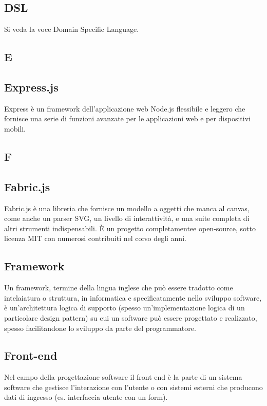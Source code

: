 \subsection*{DSL}
Si veda la voce Domain Specific Language.

\newpage

\begin{center}
\Huge\section*{\uppercase{E}}
\end{center}

\subsection*{Express.js}
Express è un framework dell'applicazione web Node.js flessibile e leggero che fornisce una serie di funzioni avanzate per le applicazioni web e per dispositivi mobili.

\newpage

\begin{center}
\Huge\section*{\uppercase{F}}
\end{center}

\subsection*{Fabric.js}
Fabric.js è una libreria che fornisce un modello a oggetti che manca al canvas, come anche un parser SVG, un livello di interattività, e una suite completa di altri strumenti indispensabili. È un progetto completamentee open-source, sotto licenza MIT con numerosi contribuiti nel corso degli anni.

\subsection*{Framework}
Un framework, termine della lingua inglese che può essere tradotto come intelaiatura o struttura, in informatica e specificatamente nello sviluppo software, è un'architettura logica di supporto (spesso un'implementazione logica di un particolare design pattern) su cui un software può essere progettato e realizzato, spesso facilitandone lo sviluppo da parte del programmatore.

\subsection*{Front-end}
Nel campo della progettazione software il front end è la parte di un sistema software che gestisce l'interazione con l'utente o con sistemi esterni che producono dati di ingresso (es. interfaccia utente con un form).

